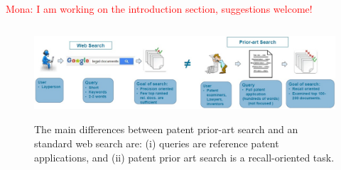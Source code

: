 
\textcolor{red}{Mona: I am working on the introduction section, suggestions welcome!}
\begin{figure}[htpb]
   \centering
   \includegraphics[width=\textwidth,height=35mm]{figs/webprior.jpg}
   \caption{The main differences between patent prior-art search and an standard web search are: (i) queries are reference patent
applications, and (ii) patent prior art search is a recall-oriented task.}  
   \label{fig:compareappr} 
\end{figure}
\FloatBarrier
